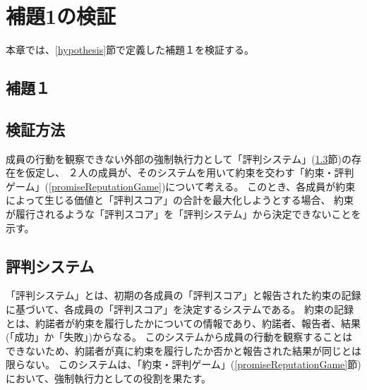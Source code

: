 \chapter{補題1の検証}
本章では、\ref{hypothesis}節で定義した補題１を検証する。

\section{補題１}
\firstLemma

\section{検証方法}
成員の行動を観察できない外部の強制執行力として「評判システム」(\ref{reputationSystem}節)の存在を仮定し、
２人の成員が、そのシステムを用いて約束を交わす「約束・評判ゲーム」(\ref{promiseReputationGame})について考える。
このとき、各成員が約束によって生じる価値と「評判スコア」の合計を最大化しようとする場合、
約束が履行されるような「評判スコア」を「評判システム」から決定できないことを示す。


\section{評判システム}
\label{reputationSystem}
「評判システム」とは、初期の各成員の「評判スコア」と報告された約束の記録に基づいて、各成員の「評判スコア」を決定するシステムである。
約束の記録とは、約諾者が約束を履行したかについての情報であり、約諾者、報告者、結果(「成功」か「失敗」)からなる。
このシステムから成員の行動を観察することはできないため、約諾者が真に約束を履行したか否かと報告された結果が同じとは限らない。
このシステムは、「約束・評判ゲーム」(\ref{promiseReputationGame}節)において、強制執行力としての役割を果たす。


